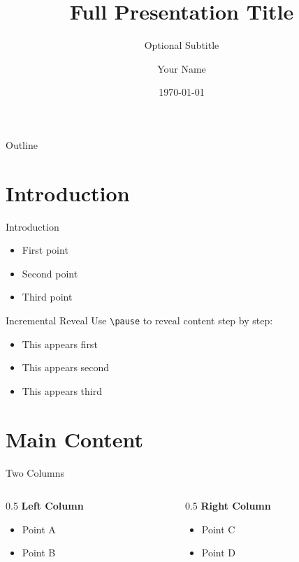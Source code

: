 \documentclass{beamer}
\title[Short Title]{Full Presentation Title}
\subtitle{Optional Subtitle}
\author{Your Name}
\institute{Your Institution}
\date{\today}
\begin{document}
\begin{frame}
    \titlepage
\end{frame}

\begin{frame}{Outline}
    \tableofcontents
\end{frame}

\section{Introduction}

\begin{frame}{Introduction}
    \begin{itemize}
        \item First point
        \item Second point
        \item Third point
    \end{itemize}
\end{frame}

\begin{frame}{Incremental Reveal}
    Use \texttt{\textbackslash pause} to reveal content step by step:
    \begin{itemize}
        \item This appears first \pause
        \item This appears second \pause
        \item This appears third
    \end{itemize}
\end{frame}

\section{Main Content}

\begin{frame}{Two Columns}
    \begin{columns}
        \begin{column}{0.5\textwidth}
            \textbf{Left Column}
            \begin{itemize}
                \item Point A
                \item Point B
            \end{itemize}
        \end{column}
        \begin{column}{0.5\textwidth}
            \textbf{Right Column}
            \begin{itemize}
                \item Point C
                \item Point D
            \end{itemize}
        \end{column}
    \end{columns}
\end{frame}
\end{document}
